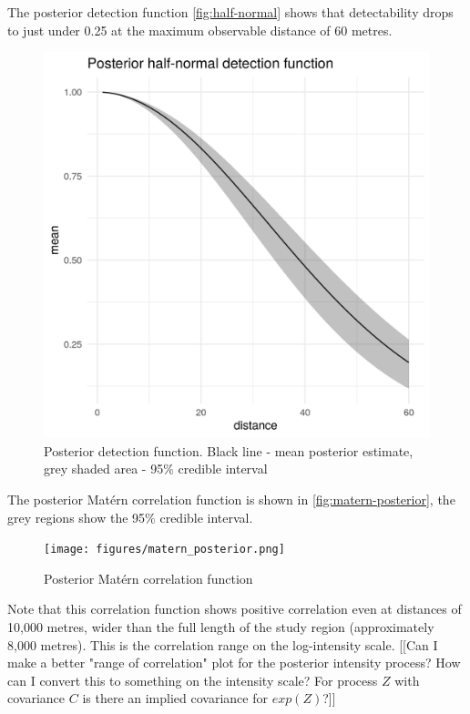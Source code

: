 \documentclass[preprint,12pt]{elsarticle}
\begin{document}
The posterior detection function \autoref{fig:half-normal} shows that detectability drops to just under 0.25 at the maximum observable distance of 60 metres.
\begin{figure}[h]
	\begin{center}
		\includegraphics[scale=0.4]{figures/halfnormal.png}
		\caption{Posterior detection function.  Black line - mean posterior estimate, grey shaded area - 95\% credible interval}
		\label{fig:half-normal}
	\end{center}
\end{figure}
The posterior Mat\'ern correlation function is shown in \autoref{fig:matern-posterior}, the grey regions show the 95\% credible interval. 
\begin{figure}[h]
	\begin{center}
		\texttt{[image: figures/matern\_posterior.png]}
		\caption{Posterior Mat\'ern correlation function}
		\label{fig:matern-posterior}
	\end{center}
\end{figure}
Note that this correlation function shows positive correlation even at distances of 10,000 metres, wider than the full length of the study region (approximately 8,000 metres).  This is the correlation range on the log-intensity scale.  [[Can I make a better "range of correlation" plot for the posterior intensity process?  How can I convert this to something on the intensity scale?  For process $Z$ with covariance $C$ is there an implied covariance for $exp(Z)$?]]
\end{document}
